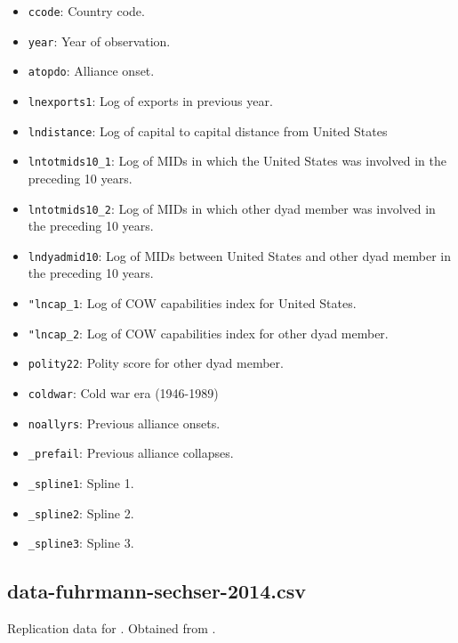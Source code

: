 \documentclass[12pt]{article}
\begin{document}
\begin{itemize}
  \item \texttt{ccode}: Country code.
  \item \texttt{year}: Year of observation.
  \item \texttt{atopdo}: Alliance onset.
  \item \texttt{lnexports1}: Log of exports in previous year.
  \item \texttt{lndistance}: Log of capital to capital distance from United States
  \item \texttt{lntotmids10\_1}:  Log of MIDs in which the United States was involved in the preceding 10 years.
  \item \texttt{lntotmids10\_2}: Log of MIDs in which other dyad member was involved in the preceding 10 years.
  \item \texttt{lndyadmid10}: Log of MIDs between United States and other dyad member in the preceding 10 years.
  \item \texttt{"lncap\_1}: Log of COW capabilities index for United States.
  \item \texttt{"lncap\_2}: Log of COW capabilities index for other dyad member.
  \item \texttt{polity22}: Polity score for other dyad member.
  \item \texttt{coldwar}: Cold war era (1946-1989)
  \item \texttt{noallyrs}: Previous alliance onsets.
  \item \texttt{\_prefail}: Previous alliance collapses.
  \item \texttt{\_spline1}: Spline 1.
  \item \texttt{\_spline2}: Spline 2.
  \item \texttt{\_spline3}: Spline 3.
\end{itemize}

\subsection{data-fuhrmann-sechser-2014.csv}

Replication data for \citet{Fuhrmann:2014kd}.
Obtained from \citet{fuhrmann2014data}.
\end{document}

